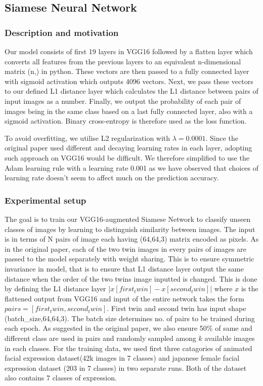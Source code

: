 \documentclass{article}
\begin{document}
\subsection{Siamese Neural Network}

\subsubsection{\textbf{Description and motivation}}

Our model consists of first 19 layers in VGG16 followed by a flatten layer which converts all features from the previous layers to
an equivalent n-dimensional matrix (n,) in python. These vectors are then passed to a fully connected layer with sigmoid activation which outputs 4096 vectors. Next, we pass these vectors to our defined L1 distance layer which calculates the L1 distance between pairs of input images as a number. Finally, we output the probability of each pair of images being in the same class based on a last fully connected layer, also with a sigmoid activation. Binary cross-entropy is therefore used as the loss function.

To avoid overfitting, we utilise L2 regularization with $\lambda=0.0001$. Since the original paper used different and decaying learning rates in each layer, adopting such approach on VGG16 would be difficult. We therefore simplified to use the Adam learning rule with a learning rate 0.001 as we have observed that choices of learning rate doesn't seem to affect much on the prediction accuracy.

\subsubsection{\textbf{Experimental setup}}

The goal is to train our VGG16-augmented Siamese Network to classify unseen classes of images by learning to distinguish similarity between images. The input is in terms of N pairs of image each having (64,64,3) matrix encoded as pixels. As in the original paper, each of the two twin images in every pairs of images are passed to the model separately with weight sharing. This is to ensure symmetric invariance in model, that is to ensure that L1 distance layer output the same distance when the order of the two twins image inputted is changed. This is done by defining the L1 distance layer $|x[first_twin] - x[second_twin]|$ where $x$ is the flattened output from VGG16 and input of the entire network takes the form $pairs=[first_twin,second_twin]$. First twin and second twin has input shape (batch_size,64,64,3). The batch size determines no. of pairs to be trained during each epoch. As suggested in the original paper, we also ensure 50$\%$ of same and different class are used in pairs and randomly sampled among $k$ available images in each classes. For the training data, we used first three catagories of animated facial expression dataset(42k images in 7 classes) and japanese female facial expression dataset (203 in 7 classes) in two separate runs. Both of the dataset also contains 7 classes of expression.
\end{document}
